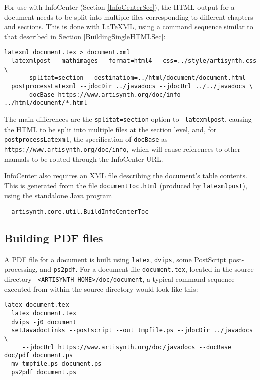 \documentclass{article}
\begin{document}
For use with InfoCenter (Section \ref{InfoCenterSec}), the HTML output
for a document needs to be split into multiple files corresponding to
different chapters and sections. This is done with LaTeXML, using a
command sequence similar to that described in
Section \ref{BuildingSingleHTMLSec}:

\begin{lstlisting}[]
  latexml document.tex > document.xml
  latexmlpost --mathimages --format=html4 --css=../style/artisynth.css \
     --splitat=section --destinatiom=../html/document/document.html
  postprocessLatexml --jdocDir ../javadocs --jdocUrl ../../javadocs \
     --docBase https://www.artisynth.org/doc/info ../html/document/*.html
\end{lstlisting}

The main differences are the {\tt \DHY splitat=section} option to {\tt
latexmlpost}, causing the HTML to be split into multiple files at the
section level, and, for {\tt postprocessLatexml}, the specification of
{\tt \DHY docBase} as\\ {\tt https://www.artisynth.org/doc/info},
which will cause references to other manuals to be routed through the
InfoCenter URL.

InfoCenter also requires an XML file describing the document's table
contents. This is generated from the file {\tt documentToc.html}
(produced by {\tt latexmlpost}), using the standalone Java program
%
\begin{verbatim}
  artisynth.core.util.BuildInfoCenterToc
\end{verbatim}
%

\subsection{Building PDF files}
\label{BuildingPDFSec}

A PDF file for a document is built using {\tt latex}, {\tt dvips},
some PostScript post-processing, and {\tt ps2pdf}. For a document file
{\tt document.tex}, located in the source directory {\tt
<ARTISYNTH\_HOME>/doc/document}, a typical command sequence executed
from within the source directory would look like this:

\begin{lstlisting}[]
  latex document.tex
  latex document.tex
  dvips -j0 document
  setJavadocLinks --postscript --out tmpfile.ps --jdocDir ../javadocs \
     --jdocUrl https://www.artisynth.org/doc/javadocs --docBase doc/pdf document.ps
  mv tmpfile.ps document.ps
  ps2pdf document.ps
\end{lstlisting}
\end{document}
